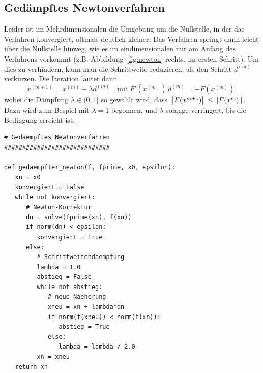 \subsection{Gedämpftes Newtonverfahren}

Leider ist im Mehrdimensionalen die Umgebung um die Nullstelle, in der
das Verfahren konvergiert, oftmals deutlich kleiner. Das Verfahren
springt dann leicht über die Nullstelle hinweg, wie es im
eindimensionalen nur am Anfang des Verfahrens vorkommt
(z.B. Abbildung~\ref{fig:newton} rechts, im ersten Schritt). Um dies
zu verhindern, kann man die Schrittweite reduzieren, als den Schritt
$d^{(m)}$ verkürzen. Die Iteration lautet dann
\begin{equation}
  x^{(m+1)} = x^{(m)} + \lambda d^{(m)}\quad\text{mit}\;
  F'(x^{(m)})\,d^{(m)} = -F(x^{(m)}),
\end{equation}
wobei die Dämpfung $\lambda\in (0,1]$ so gewählt wird, dass
$\left\lVert{F(x^{m+1})}\right\rVert\le\left\lVert{F(x^{m})}\right\rVert$. Dazu wird zum Bespiel mit
$\lambda=1$ begonnen, und $\lambda$ solange verringert, bis die
Bedingung erreicht ist.

\begin{lstlisting}[style=floating,deletekeywords={lambda}, float=t,
caption={Gedämpftes Newtonverfahren in mehreren
Dimensionen. \lstinline!f(x)! muß
eine vektorwertige Funktion sein, \lstinline!fprime(x)! ihre
Ableitung, d.h. eine matrixwertige Funktion.}]
# Gedaempftes Newtonverfahren
#############################

def gedaempfter_newton(f, fprime, x0, epsilon):
   xn = x0
   konvergiert = False
   while not konvergiert:
      # Newton-Korrektur
      dn = solve(fprime(xn), f(xn))
      if norm(dn) < epsilon:
         konvergiert = True
      else:
         # Schrittweitendaempfung
         lambda = 1.0
         abstieg = False
         while not abstieg:
            # neue Naeherung
            xneu = xn + lambda*dn
            if norm(f(xneu)) < norm(f(xn)):
               abstieg = True
            else:
               lambda = lambda / 2.0
         xn = xneu
   return xn
\end{lstlisting}

